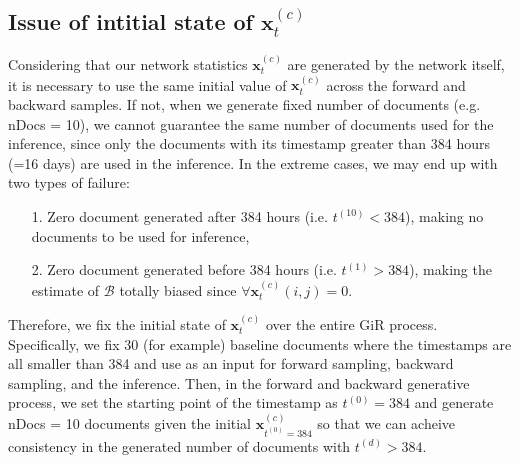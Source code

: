 \documentclass[a4paper]{article}
\begin{document}
      \subsection{Issue of intitial state of $\boldsymbol{x}_t^{(c)}$} \label{subsubsec: Initial history issue}
      Considering that our network statistics $\boldsymbol{x}_t^{(c)}$ are generated by the network itself, it is necessary to use the same initial value of $\boldsymbol{x}_t^{(c)}$ across the forward and backward samples. If not, when we generate fixed number of documents (e.g. nDocs = 10), we cannot guarantee the same number of documents used for the inference, since only the documents with its timestamp greater than 384 hours (=16 days) are used in the inference. In the extreme cases, we may end up with two types of failure:
      \begin{itemize}
      	\item[1.] Zero document generated after 384 hours (i.e. $t^{(10)} < 384$), making no documents to be used for inference,
      	\item[2.] Zero document generated before 384 hours (i.e. $t^{(1)} > 384$), making the estimate of $\mathcal{B}$ totally biased since $\forall  \boldsymbol{x}_t^{(c)}(i, j) = 0$. 
      \end{itemize}
      Therefore, we fix the initial state of $\boldsymbol{x}_t^{(c)}$ over the entire GiR process. Specifically, we fix 30 (for example) baseline documents where the timestamps are all smaller than 384 and use as an input for forward sampling, backward sampling, and the inference. Then, in the forward and backward generative process, we set the starting point of the timestamp as $t^{(0)} = 384$ and generate nDocs = 10 documents given the initial $\boldsymbol{x}_{t^{(0)} = 384}^{(c)}$ so that we can acheive consistency in the generated number of documents with $t^{(d)} > 384$.
\end{document}
